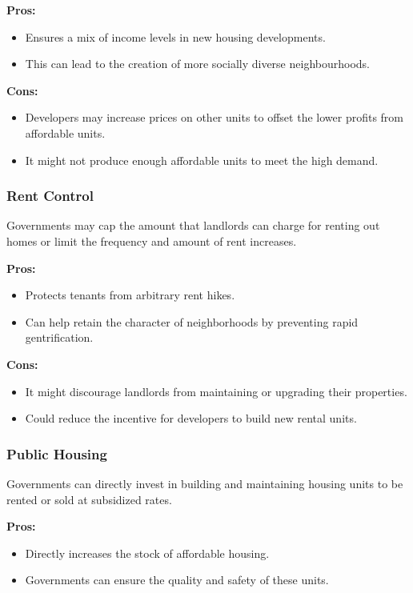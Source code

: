 \textbf{Pros:}
\begin{itemize}
    \item Ensures a mix of income levels in new housing developments.
    \item This can lead to the creation of more socially diverse neighbourhoods.
\end{itemize}

\textbf{Cons:}
\begin{itemize}
    \item Developers may increase prices on other units to offset the lower profits from affordable units.
    \item It might not produce enough affordable units to meet the high demand.
\end{itemize}

\subsubsection*{Rent Control}
Governments may cap the amount that landlords can charge for renting out homes or limit the frequency and amount of rent increases.

\textbf{Pros:}
\begin{itemize}
    \item Protects tenants from arbitrary rent hikes.
    \item Can help retain the character of neighborhoods by preventing rapid gentrification.
\end{itemize}

\textbf{Cons:}
\begin{itemize}
    \item It might discourage landlords from maintaining or upgrading their properties.
    \item Could reduce the incentive for developers to build new rental units.
\end{itemize}

\subsubsection*{Public Housing}
Governments can directly invest in building and maintaining housing units to be rented or sold at subsidized rates.

\textbf{Pros:}
\begin{itemize}
    \item Directly increases the stock of affordable housing.
    \item Governments can ensure the quality and safety of these units.
\end{itemize}

